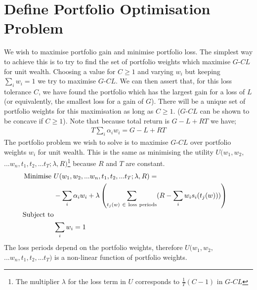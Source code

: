 \documentclass[12pt]{article}
\begin{document}
\section{Define Portfolio Optimisation Problem}
We wish to maximise portfolio gain and minimise portfolio loss. The simplest way to achieve this is to try to
find the set of portfolio weights which maximise $G$-$C L$ for unit wealth. Choosing a value for
$C \ge 1$ and varying $w_i$
but keeping $\sum_i w_i = 1$ we try to maximise $G$-$C L$. We can then assert that, for this loss tolerance $C$, we have found the 
portfolio which has the largest gain for a loss of $L$ (or equivalently, the smallest loss for a gain of $G$).
There will be a unique set of portfolio weights for this maximisation as long as $C\ge1$. ($G$-$C L$
can be shown to be concave if $C\ge1$). Note that because total return is $G-L+RT$ we have;
\begin{eqnarray}
    T\sum_i \alpha_i w_i = G-L+RT
\end{eqnarray}
The portfolio problem we wish to solve is to maximise $G$-$C L$ over portfolio weights $w_i$ for unit wealth.
This is the same as minimising the utility $U(w_1,w_2,$ $...w_n,t_1,t_2,...t_T;\lambda , R)$\footnote{The multiplier $\lambda$ for the loss term in $U$ corresponds to $\frac{1}{T}(C-1)$ in $G$-$CL$} because $R$ and $T$ are constant.
\begin{align*}
    {\rm Minimise}\ & U(w_1,w_2,...w_n,t_1,t_2,...t_T;\lambda ,R)=\quad\cr \quad  & -\sum_i \alpha_i w_i + \lambda \left( \sum_{t_j (w)\ \in\ \rm loss\ periods}( R-\sum_i w_i s_i(t_j (w)) )\right)\cr
    {\rm Subject\ to}\cr & \sum_i w_i  = 1
\end{align*}
The
loss periods depend on the portfolio weights, therefore $U(w_1,w_2,$ $...w_n,t_1,t_2,...t_T)$ is a non-linear function of portfolio weights.
\end{document}
